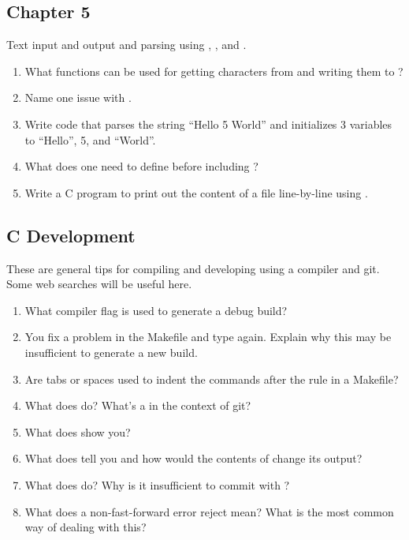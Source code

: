 \subsection{Chapter 5}

Text input and output and parsing using , , and .

\begin{enumerate}
\item What functions can be used for getting characters from  and writing them to ?
\item Name one issue with .
\item Write code that parses the string ``Hello 5 World'' and initializes 3 variables to ``Hello'', 5, and ``World''.
\item What does one need to define before including ?
\item Write a C program to print out the content of a file line-by-line using .
\end{enumerate}

\subsection{C Development}

These are general tips for compiling and developing using a compiler and git.
Some web searches will be useful here.

\begin{enumerate}
\item What compiler flag is used to generate a debug build?
\item You fix a problem in the Makefile and type  again.
Explain why this may be insufficient to generate a new build.
\item Are tabs or spaces used to indent the commands after the rule in a Makefile?
\item What does  do? What's a  in the context of git?
\item What does  show you?
\item What does  tell you and how would the contents of  change its output?
\item What does  do? Why is it insufficient to commit with ?
\item What does a non-fast-forward error  reject mean? What is the most common way of dealing with this?
\end{enumerate}

